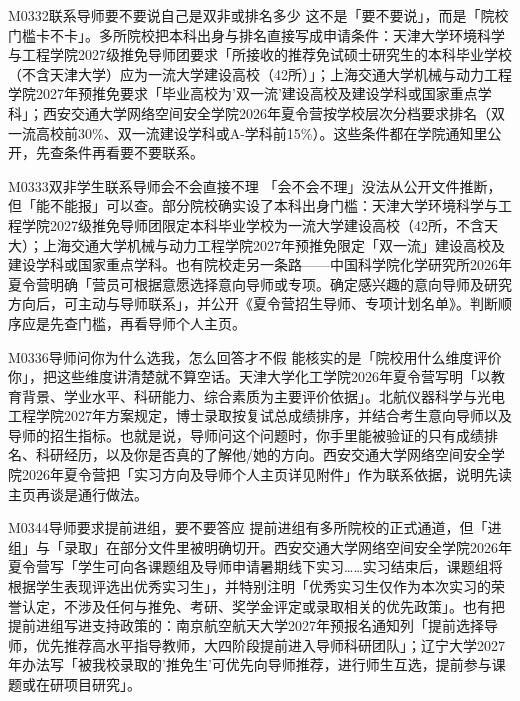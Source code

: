 \begin{qa}{M0332}{联系导师要不要说自己是双非或排名多少}
这不是「要不要说」，而是「院校门槛卡不卡」。多所院校把本科出身与排名直接写成申请条件：天津大学环境科学与工程学院2027级推免导师团要求「所接收的推荐免试硕士研究生的本科毕业学校（不含天津大学）应为一流大学建设高校（42所）」；上海交通大学机械与动力工程学院2027年预推免要求「毕业高校为'双一流'建设高校及建设学科或国家重点学科」；西安交通大学网络空间安全学院2026年夏令营按学校层次分档要求排名（双一流高校前30\%、双一流建设学科或A-学科前15\%）。这些条件都在学院通知里公开，先查条件再看要不要联系。
\end{qa}

\begin{qa}{M0333}{双非学生联系导师会不会直接不理}
「会不会不理」没法从公开文件推断，但「能不能报」可以查。部分院校确实设了本科出身门槛：天津大学环境科学与工程学院2027级推免导师团限定本科毕业学校为一流大学建设高校（42所，不含天大）；上海交通大学机械与动力工程学院2027年预推免限定「双一流」建设高校及建设学科或国家重点学科。也有院校走另一条路——中国科学院化学研究所2026年夏令营明确「营员可根据意愿选择意向导师或专项。确定感兴趣的意向导师及研究方向后，可主动与导师联系」，并公开《夏令营招生导师、专项计划名单》。判断顺序应是先查门槛，再看导师个人主页。
\end{qa}

\begin{qa}{M0336}{导师问你为什么选我，怎么回答才不假}
能核实的是「院校用什么维度评价你」，把这些维度讲清楚就不算空话。天津大学化工学院2026年夏令营写明「以教育背景、学业水平、科研能力、综合素质为主要评价依据」。北航仪器科学与光电工程学院2027年方案规定，博士录取按复试总成绩排序，并结合考生意向导师以及导师的招生指标。也就是说，导师问这个问题时，你手里能被验证的只有成绩排名、科研经历，以及你是否真的了解他/她的方向。西安交通大学网络空间安全学院2026年夏令营把「实习方向及导师个人主页详见附件」作为联系依据，说明先读主页再谈是通行做法。
\end{qa}

\begin{qa}{M0344}{导师要求提前进组，要不要答应}
提前进组有多所院校的正式通道，但「进组」与「录取」在部分文件里被明确切开。西安交通大学网络空间安全学院2026年夏令营写「学生可向各课题组及导师申请暑期线下实习……实习结束后，课题组将根据学生表现评选出优秀实习生」，并特别注明「优秀实习生仅作为本次实习的荣誉认定，不涉及任何与推免、考研、奖学金评定或录取相关的优先政策」。也有把提前进组写进支持政策的：南京航空航天大学2027年预报名通知列「提前选择导师，优先推荐高水平指导教师，大四阶段提前进入导师科研团队」；辽宁大学2027年办法写「被我校录取的'推免生'可优先向导师推荐，进行师生互选，提前参与课题或在研项目研究」。
\end{qa}

